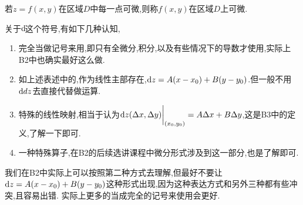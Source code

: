 若$z=f(x,y)$在区域$D$中每一点可微,则称$f(x,y)$在区域$D$上可微.

\begin{remark}
    关于$\operatorname{d\!}$这个符号,有如下几种认知,
    \begin{enumerate}
        \item 完全当做记号来用,即只有全微分,积分,以及有些情况下的导数才使用,实际上B2中也确实最好这么做.
        \item 如上述表述中的,作为线性主部存在,$\operatorname{d\!}{}z=A(x-x_0)+B(y-y_0)$.但一般不用$\operatorname{d\!}{}d z$去直接代替做运算.
        \item 特殊的线性映射,相当于认为$\operatorname{d\!}{}z(\Delta x,\Delta y)\bigg|_{(x_0,y_0)}=A\Delta x+B\Delta y$,这是B3中的定义,了解一下即可.
        \item 一种特殊算子,在B2的后续选讲课程中微分形式涉及到这一部分,也是了解即可.
    \end{enumerate}
    我们在B2中实际上可以按照第二种方式去理解,但最好不要让$\operatorname{d\!}{}z=A(x-x_0)+B(y-y_0)$这种形式出现,因为这种表达方式和另外三种都有些冲突,且容易出错.
    实际上更多的当成完全的记号来使用会更好.
\end{remark}

